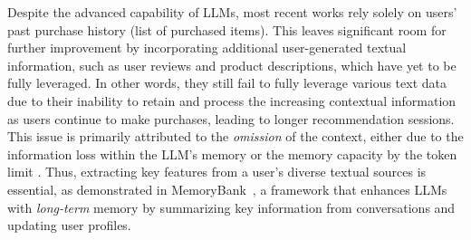 %

Despite the advanced capability of LLMs, most recent works \cite{hou2024large, wei2024llmrec, ren2024representation, he2023large, zhai2023knowledge} rely solely on users' past purchase history (\ie list of purchased items). This leaves significant room for further improvement by incorporating additional user-generated textual information, such as user reviews and product descriptions, which have yet to be fully leveraged.
%
In other words, they still fail to fully leverage various text data due to their inability to retain and process the increasing contextual information as users continue to make purchases, leading to longer recommendation sessions. This issue is primarily attributed to the \emph{omission} of the context, either due to the information loss within the LLM's memory \cite{liu2024lost} or the memory capacity by the token limit \cite{li2024survey, ding2024longrope}. 
Thus, extracting key features from a user's diverse textual sources is essential, as demonstrated in MemoryBank~\cite{zhong2024memorybank}, a framework that enhances LLMs with \emph{long-term} memory by summarizing key information from conversations and updating user profiles. 

